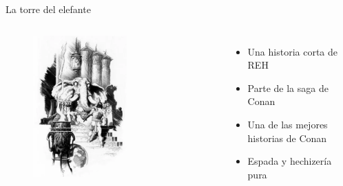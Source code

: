 \begin{frame}{}
    \maketitle
\end{frame}


\begin{frame}{La torre del elefante}
\begin{columns}
 \begin{figure}[htb]
  \centering
  \includegraphics[width=0.6\textwidth]{img/Intro}
\end{figure}    
     \begin{itemize}
         \item Una historia corta de REH
         \item Parte de la saga de Conan
         \item Una de las mejores historias de Conan
         \item Espada y hechizería pura
     \end{itemize}
\end{columns}
\end{frame}

